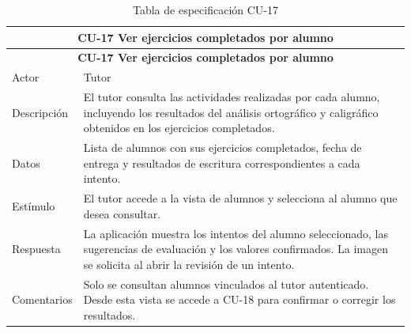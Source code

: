 \begin{longtable}{|p{4cm}|p{11cm}|}
\caption{Tabla de especificación CU-17}
\label{tab:cu17} \\

\hline
\multicolumn{2}{|c|}{\textbf{CU-17 Ver ejercicios completados por alumno}} \\
\hline
\endfirsthead

\hline
\multicolumn{2}{|c|}{\textbf{CU-17 Ver ejercicios completados por alumno}} \\
\hline
\endhead

\hline
\endfoot
\endlastfoot

Actor & Tutor \\
\hline

Descripción & El tutor consulta las actividades realizadas por cada alumno, incluyendo los resultados del análisis ortográfico y caligráfico obtenidos en los ejercicios completados. \\
\hline

Datos & Lista de alumnos con sus ejercicios completados, fecha de entrega y resultados de escritura correspondientes a cada intento. \\
\hline

Estímulo & El tutor accede a la vista de alumnos y selecciona al alumno que desea consultar. \\
\hline

Respuesta & La aplicación muestra los intentos del alumno seleccionado, las sugerencias de evaluación y los valores confirmados. La imagen se solicita al abrir la revisión de un intento. \\
\hline

Comentarios & Solo se consultan alumnos vinculados al tutor autenticado. Desde esta vista se accede a CU-18 para confirmar o corregir los resultados. \\
\hline

\end{longtable}


